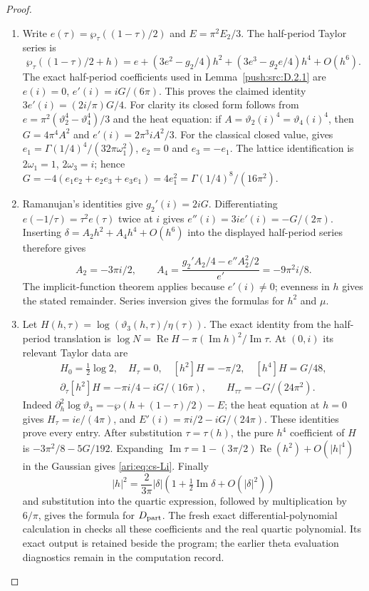 \begin{proof}
\begin{enumerate}[label=\arabic*.,leftmargin=*]
\item Write $e(\tau)=\wp_\tau((1-\tau)/2)$ and
$E=\pi^2E_2/3$. The half-period Taylor series is
\[
 \wp_\tau((1-\tau)/2+h)
 =e+(3e^2-g_2/4)h^2+(3e^3-g_2e/4)h^4+O(h^6).
\]
The exact half-period coefficients used in Lemma~\ref{push:src:D.2.1} are
$e(i)=0$, $e'(i)=iG/(6\pi)$. This proves the claimed identity
$3e'(i)=(2i/\pi)G/4$. For clarity its closed form follows from
$e=\pi^2(\vartheta_2^4-\vartheta_4^4)/3$ and the heat equation:
if $A=\vartheta_2(i)^4=\vartheta_4(i)^4$, then
$G=4\pi^4A^2$ and $e'(i)=2\pi^3iA^2/3$.
For the classical closed value, \cite[Equation 23.5.3]{DLMFTheta2026}
gives $e_1=\Gamma(1/4)^4/(32\pi\omega_1^2)$,
$e_2=0$ and $e_3=-e_1$.  The lattice identification is
$2\omega_1=1$, $2\omega_3=i$; hence
$G=-4(e_1e_2+e_2e_3+e_3e_1)=4e_1^2
=\Gamma(1/4)^8/(16\pi^2)$.

\item Ramanujan's identities give $g_2'(i)=2iG$. Differentiating
$e(-1/\tau)=\tau^2 e(\tau)$ twice at $i$ gives
$e''(i)=3i e'(i)=-G/(2\pi)$. Inserting
$\delta=A_2h^2+A_4h^4+O(h^6)$ into the displayed half-period series
therefore gives
\[
 A_2=-3\pi i/2,\qquad
 A_4=\frac{g_2'A_2/4-e''A_2^2/2}{e'}=-9\pi^2i/8.
\]
The implicit-function theorem applies because $e'(i)\ne0$;
evenness in $h$ gives the stated remainder. Series inversion gives
the formulas for $h^2$ and $\mu$.

\item Let $H(h,\tau)=\log(\vartheta_3(h,\tau)/\eta(\tau))$. The exact
identity from the half-period translation is
$\log N=\operatorname{Re}H-\pi(\operatorname{Im}h)^2/
\operatorname{Im}\tau$. At $(0,i)$ its relevant Taylor data are
\[
 \begin{gathered}
 H_0=\tfrac12\log2,\quad H_\tau=0,\quad
 [h^2]H=-\pi/2,\quad [h^4]H=G/48,\\
 \partial_\tau[h^2]H=-\pi i/4-iG/(16\pi),\qquad
 H_{\tau\tau}=-G/(24\pi^2).
 \end{gathered}
\]
Indeed $\partial_h^2\log\vartheta_3=-\wp(h+(1-\tau)/2)-E$;
the heat equation at $h=0$ gives $H_\tau=ie/(4\pi)$, and
$E'(i)=\pi i/2-iG/(24\pi)$. These identities prove every entry.
After substitution $\tau=\tau(h)$, the pure $h^4$ coefficient of
$H$ is $-3\pi^2/8-5G/192$. Expanding
$\operatorname{Im}\tau=1-(3\pi/2)\operatorname{Re}(h^2)+O(|h|^4)$
in the Gaussian gives \eqref{ari:eq:cs-Li}. Finally
\[
 |h|^2=\frac{2}{3\pi}|\delta|
          \left(1+\tfrac12\operatorname{Im}\delta+O(|\delta|^2)\right)
\]
and substitution into the quartic expression, followed by
multiplication by $6/\pi$, gives the formula for $D_{\rm part}$.
The fresh exact differential-polynomial calculation in
checks all these coefficients and the real quartic polynomial.
Its exact output is retained beside the program; the earlier theta
evaluation diagnostics remain in the computation record.
\end{enumerate}
\end{proof}

